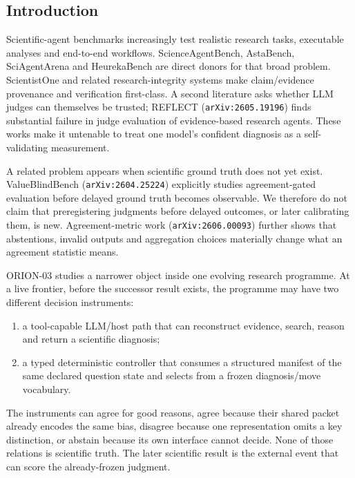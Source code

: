 \documentclass[10pt]{article}
\providecommand{\tightlist}{%
  \setlength{\itemsep}{0pt}\setlength{\parskip}{0pt}}
\begin{document}
\hypertarget{introduction}{%
\subsection{Introduction}\label{introduction}}

Scientific-agent benchmarks increasingly test realistic research tasks,
executable analyses and end-to-end workflows. ScienceAgentBench,
AstaBench, SciAgentArena and HeurekaBench
\citep{chen2025scienceagentbench, bragg2025astabench, liu2026sciagentarena, panigrahi2026heurekabench}
are direct donors for that broad problem. ScientistOne
\citep{meng2026scientistone} and related research-integrity systems make
claim/evidence provenance and verification first-class. A second
literature asks whether LLM judges can themselves be trusted; REFLECT
(\texttt{arXiv:2605.19196}) \citep{wang2026reflect} finds substantial
failure in judge evaluation of evidence-based research agents. These
works make it untenable to treat one model's confident diagnosis as a
self-validating measurement.

A related problem appears when scientific ground truth does not yet
exist. ValueBlindBench (\texttt{arXiv:2604.25224})
\citep{chang2026valueblindbench} explicitly studies agreement-gated
evaluation before delayed ground truth becomes observable. We therefore
do not claim that preregistering judgments before delayed outcomes, or
later calibrating them, is new. Agreement-metric work
(\texttt{arXiv:2606.00093}) \citep{rao2026agreementmetrics} further
shows that abstentions, invalid outputs and aggregation choices
materially change what an agreement statistic means.

ORION-03 studies a narrower object inside one evolving research
programme. At a live frontier, before the successor result exists, the
programme may have two different decision instruments:

\begin{enumerate}
\def\labelenumi{\arabic{enumi}.}
\tightlist
\item
  a tool-capable LLM/host path that can reconstruct evidence, search,
  reason and return a scientific diagnosis;
\item
  a typed deterministic controller that consumes a structured manifest
  of the same declared question state and selects from a frozen
  diagnosis/move vocabulary.
\end{enumerate}

The instruments can agree for good reasons, agree because their shared
packet already encodes the same bias, disagree because one
representation omits a key distinction, or abstain because its own
interface cannot decide. None of those relations is scientific truth.
The later scientific result is the external event that can score the
already-frozen judgment.
\end{document}
